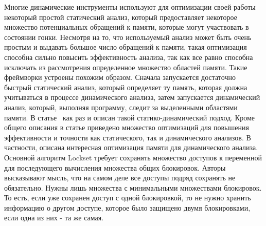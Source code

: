 

Многие динамические инструменты используют для оптимизации своей работы некоторый простой статический анализ, который предоставляет некоторое множество потенциальных обращений к памяти, которые могут участвовать в состоянии гонки.
Несмотря на то, что используемый анализ может быть очень простым и выдавать большое число обращений к памяти, такая оптимизация способна сильно повысить эффективность анализа, так как все равно способна исключать из рассмотрения определенное множество областей памяти.
Такие фреймворки устроены похожим образом.
Сначала запускается достаточно быстрый статический анализ, который определяет ту память, которая должна учитываться в процессе динамического анализа, затем запускается динамический анализ, который, выполняя программу, следит за выделенными областями памяти. 
В статье~\cite{Qi:2009:MPE} как раз и описан такой статико-динамический подход.
Кроме общего описания в статье приведено множество оптимизаций для повышения эффективности и точности как статического, так и динамического анализов.
В частности, описана интересная оптимизация памяти для динамического анализа. 
Основной алгоритм Lockset требует сохранять множество доступов к переменной для последующего вычисления множества общих блокировок.
Авторы высказывают мысль, что на самом деле все доступы подряд сохранять не обязательно.
Нужны лишь множества с минимальными множествами блокировок. То есть, если уже сохранен доступ с одной блокировкой, то не нужно хранить информацию о другом доступе, которое было защищено двумя блокировками, если одна из них - та же самая.

